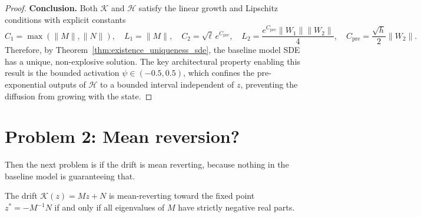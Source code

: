 \begin{proof}
\textbf{Conclusion.} Both $\mathcal{K}$ and $\mathcal{H}$ satisfy the linear growth and 
Lipschitz conditions with explicit constants
\[
C_1 = \max(\|M\|, \|N\|), \quad L_1 = \|M\|, \quad
C_2 = \sqrt{\ell}\,e^{C_{\mathrm{pre}}}, \quad 
L_2 = \frac{e^{C_{\mathrm{pre}}}\|W_1\|\|W_2\|}{4}, \quad 
C_{\mathrm{pre}} = \frac{\sqrt{h}}{2}\|W_2\|.
\]
Therefore, by Theorem~\ref{thm:existence_uniqueness_sde}, the baseline model SDE has a 
unique, non-explosive solution. The key architectural property enabling this result 
is the bounded activation $\psi \in (-0.5, 0.5)$, which confines the pre-exponential 
outputs of $\mathcal{H}$ to a bounded interval independent of $z$, preventing the 
diffusion from growing with the state.
\end{proof}


\section{Problem 2: Mean reversion?}

Then the next problem is if the drift is mean reverting, because nothing in the baseline model is guaranteeing that. 



\begin{proposition}
The drift $\mathcal{K}(z) = Mz + N$ is mean-reverting toward the fixed point
$z^* = -M^{-1}N$ if and only if all eigenvalues of $M$ have strictly negative
real parts.
\end{proposition}

